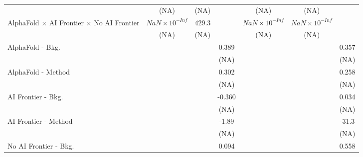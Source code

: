 \begin{tabular}{lcccccc}
                                                                              & (NA)                   & (NA)   &        & (NA)                   & (NA)                   &   \\   
   AlphaFold $\times$ AI Frontier $\times$ No AI Frontier                     & $NaN\times 10^{-Inf}$  & 429.3  &        & $NaN\times 10^{-Inf}$  & $NaN\times 10^{-Inf}$  &   \\   
                                                                              & (NA)                   & (NA)   &        & (NA)                   & (NA)                   &   \\   
   AlphaFold - Bkg.                                                           &                        &        & 0.389  &                        &                        & 0.357\\   
                                                                              &                        &        & (NA)   &                        &                        & (NA)\\   
   AlphaFold - Method                                                         &                        &        & 0.302  &                        &                        & 0.258\\   
                                                                              &                        &        & (NA)   &                        &                        & (NA)\\   
   AI Frontier - Bkg.                                                         &                        &        & -0.360 &                        &                        & 0.034\\   
                                                                              &                        &        & (NA)   &                        &                        & (NA)\\   
   AI Frontier - Method                                                       &                        &        & -1.89  &                        &                        & -31.3\\   
                                                                              &                        &        & (NA)   &                        &                        & (NA)\\   
   No AI Frontier - Bkg.                                                      &                        &        & 0.094  &                        &                        & 0.558\\   

\end{tabular}
